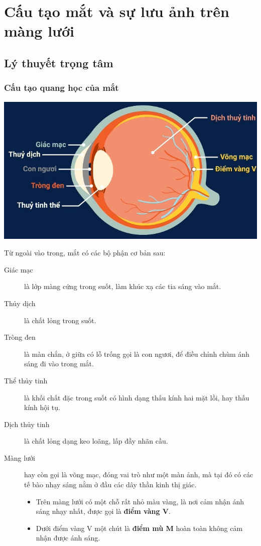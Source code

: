 \chapter{Cấu tạo mắt và sự lưu ảnh trên màng lưới}
\section{Lý thuyết trọng tâm}

\subsection{Cấu tạo quang học của mắt}
\begin{center}
	\includegraphics[scale=0.65]{../figs/VN11-PH-40-L-028-1-h32.jpg}
\end{center}
Từ ngoài vào trong, mắt có các bộ phận cơ bản sau:

\begin{description}
	\item [Giác mạc] là lớp màng cứng trong suốt, làm khúc xạ các tia sáng vào mắt.
	\item [Thủy dịch] là chất lỏng trong suốt. 
	\item [Tròng đen] là màn chắn, ở giữa có lỗ trống gọi là con ngươi, để điều chỉnh chùm ánh sáng đi vào trong mắt. 
	\item [Thể thủy tinh] là khối chất đặc trong suốt có hình dạng thấu kính hai mặt lồi, hay thấu kính hội tụ.
	\item [Dịch thủy tinh] là chất lỏng dạng keo loãng, lấp đầy nhãn cầu.
	\item [Màng lưới] hay còn gọi là võng mạc, đóng vai trò như một màn ảnh, mà tại đó có các tế bào nhạy sáng nằm ở đầu các dây thần kinh thị giác.
	\begin{itemize}
	\item Trên màng lưới có một chỗ rất nhỏ màu vàng, là nơi cảm nhận ánh sáng nhạy nhất, được gọi là \textbf{điểm vàng V}.
	
	\item Dưới điểm vàng V một chút là \textbf{điểm mù M} hoàn toàn không cảm nhận được ánh sáng.
    \end{itemize}
\end{description}


